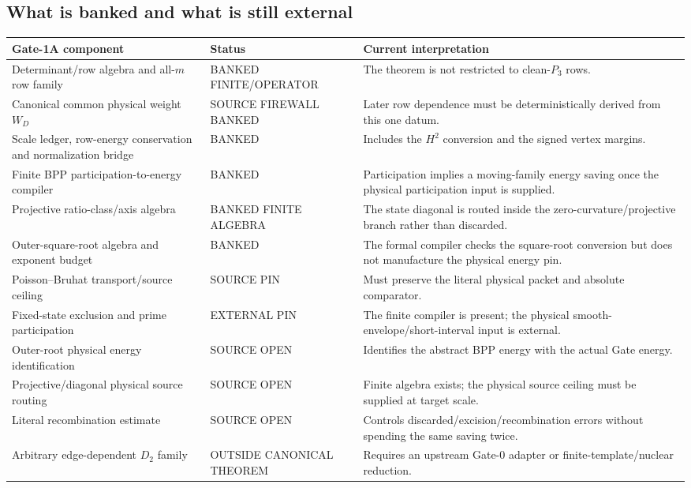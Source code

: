 \documentclass[11pt]{article}
\theoremstyle{definition}
\newcommand{\1}{\mathbf 1}
\newcommand{\status}[1]{\textsf{#1}}
\begin{document}
\subsection{What is banked and what is still external}

\begin{center}
\renewcommand{\arraystretch}{1.18}
\begin{tabularx}{\textwidth}{>{\raggedright\arraybackslash}p{}
>{\raggedright\arraybackslash}p{}X}
\toprule
Gate-1A component & Status & Current interpretation\\
\midrule
Determinant/row algebra and all-$m$ row family & \status{BANKED FINITE/OPERATOR} &
The theorem is not restricted to clean-$P_3$ rows.\\
Canonical common physical weight $W_D$ & \status{SOURCE FIREWALL BANKED} &
Later row dependence must be deterministically derived from this one datum.\\
Scale ledger, row-energy conservation and normalization bridge & \status{BANKED} &
Includes the $H^2$ conversion and the signed vertex margins.\\
Finite BPP participation-to-energy compiler & \status{BANKED} &
Participation implies a moving-family energy saving once the physical participation input is supplied.\\
Projective ratio-class/axis algebra & \status{BANKED FINITE ALGEBRA} &
The state diagonal is routed inside the zero-curvature/projective branch rather than discarded.\\
Outer-square-root algebra and exponent budget & \status{BANKED} &
The formal compiler checks the square-root conversion but does not manufacture the physical energy pin.\\
Poisson--Bruhat transport/source ceiling & \status{SOURCE PIN} &
Must preserve the literal physical packet and absolute comparator.\\
Fixed-state exclusion and prime participation & \status{EXTERNAL PIN} &
The finite compiler is present; the physical smooth-envelope/short-interval input is external.\\
Outer-root physical energy identification & \status{SOURCE OPEN} &
Identifies the abstract BPP energy with the actual Gate energy.\\
Projective/diagonal physical source routing & \status{SOURCE OPEN} &
Finite algebra exists; the physical source ceiling must be supplied at target scale.\\
Literal recombination estimate & \status{SOURCE OPEN} &
Controls discarded/excision/recombination errors without spending the same saving twice.\\
Arbitrary edge-dependent $D_2$ family & \status{OUTSIDE CANONICAL THEOREM} &
Requires an upstream Gate-0 adapter or finite-template/nuclear reduction.\\
\bottomrule
\end{tabularx}
\end{center}
\end{document}
